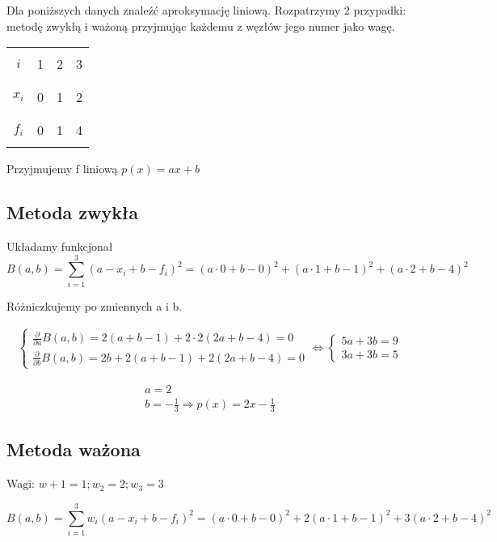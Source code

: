 \documentclass[10pt, a4paper]{article}
\begin{document}
Dla poniższych danych znaleźć aproksymację liniową. Rozpatrzymy 2 przypadki: metodę zwykłą i ważoną przyjmując każdemu z węzłów jego numer jako wagę.

\begin{center}
\begin{tabular}{|c|c|c|c|}
\hline
&&&\\
$i$&1&2&3\\
&&&\\
\hline
&&&\\
$x_i$&0&1&2\\
&&&\\
\hline
&&&\\
$f_i$&0&1&4\\
&&&\\
\hline
\end{tabular}
\end{center}

Przyjmujemy f liniową $p(x)=ax+b$

\subsection*{Metoda zwykła}

Układamy funkcjonał \[B(a,b)=\sum_{i=1}^3(a-x_i+b-f_i)^2=(a\cdot0+b-0)^2+(a\cdot1+b-1)^2+(a\cdot2+b-4)^2\]

Różniczkujemy po zmiennych a i b.

\begin{gather*}
\begin{cases}
\frac{\partial}{\partial a}B(a,b)=2(a+b-1)+2\cdot 2(2a+b-4)=0\\
\frac{\partial}{\partial b}B(a,b)=2b+2(a+b-1)+2(2a+b-4)=0
\end{cases}
\Longleftrightarrow
\begin{cases}
5a+3b=9\\
3a+3b=5
\end{cases}
\end{gather*}

\begin{gather*}
a=2\\
b=-\frac{1}{3}\Rightarrow p(x)=2x-\frac{1}{3}
\end{gather*}

\subsection*{Metoda ważona}

Wagi: $w+1=1; w_2=2; w_3=3$

\[B(a,b)=\sum_{i=1}^3w_i(a-x_i+b-f_i)^2=(a\cdot0+b-0)^2+2(a\cdot1+b-1)^2+3(a\cdot2+b-4)^2\]
\end{document}
